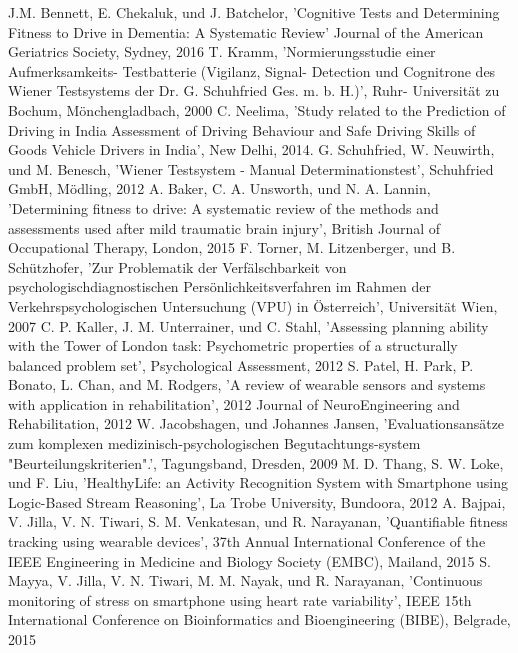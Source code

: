 \documentclass[conference]{IEEEtran}
\begin{document}
\begin{thebibliography}{00}
J.M. Bennett, E. Chekaluk, und J. Batchelor,
'Cognitive Tests and Determining Fitness to Drive in Dementia: A Systematic Review'
Journal of the American Geriatrics Society, Sydney, 2016
 T. Kramm, 'Normierungsstudie einer Aufmerksamkeits- Testbatterie (Vigilanz, Signal- Detection und Cognitrone des Wiener Testsystems der Dr. G. Schuhfried Ges. m. b. H.)', Ruhr- Universität zu Bochum, Mönchengladbach, 2000
 C. Neelima, 'Study related to the Prediction of Driving in India Assessment of Driving Behaviour and Safe Driving Skills of Goods Vehicle Drivers in India', New Delhi, 2014. 
 G. Schuhfried, W. Neuwirth, und M. Benesch, 'Wiener Testsystem - Manual Determinationstest', Schuhfried GmbH, Mödling, 2012
A. Baker, C. A. Unsworth, und N. A. Lannin,
'Determining fitness to drive: A systematic review of the methods and assessments used after mild traumatic brain injury', British Journal of Occupational Therapy, London, 2015
 F. Torner, M. Litzenberger, und B. Schützhofer, 'Zur Problematik der Verfälschbarkeit von psychologischdiagnostischen Persönlichkeitsverfahren im Rahmen der Verkehrspsychologischen Untersuchung (VPU) in Österreich', Universität Wien, 2007
 C. P. Kaller, J. M. Unterrainer, und C. Stahl, 'Assessing planning ability with the Tower of London task: Psychometric properties of a structurally balanced problem set', Psychological Assessment, 2012
 S. Patel, H. Park, P. Bonato, L. Chan, and M. Rodgers, 'A review of wearable sensors and systems with application in rehabilitation', 2012 Journal of NeuroEngineering and Rehabilitation, 2012
 W. Jacobshagen, und Johannes Jansen, 'Evaluationsansätze zum komplexen medizinisch-psychologischen Begutachtungs-system "Beurteilungskriterien".', Tagungsband,  Dresden, 2009
 M. D. Thang, S. W. Loke, und F. Liu, 'HealthyLife: an Activity Recognition System with Smartphone using Logic-Based Stream Reasoning',  La Trobe University, Bundoora, 2012
  A. Bajpai, V. Jilla, V. N. Tiwari, S. M. Venkatesan, und R. Narayanan, 'Quantifiable fitness tracking using wearable devices', 37th Annual International Conference of the IEEE Engineering in Medicine and Biology Society (EMBC), Mailand, 2015
 S. Mayya, V. Jilla, V. N. Tiwari, M. M. Nayak, und R. Narayanan, 'Continuous monitoring of stress on smartphone using heart rate variability', IEEE 15th International Conference on Bioinformatics and Bioengineering (BIBE), Belgrade, 2015

\end{thebibliography}
\end{document}

